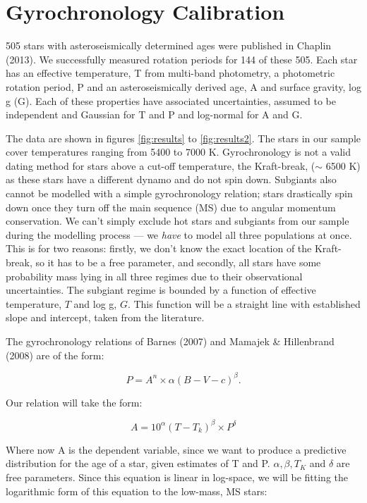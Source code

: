 \documentclass[12pt,preprint]{aastex}
\begin{document}
\section{Gyrochronology Calibration}

505 stars with asteroseismically determined ages were published in Chaplin (2013).
We successfully measured rotation periods for 144 of these 505.
Each star has an effective temperature, T from multi-band photometry, a photometric rotation period, P and an asteroseismically derived age, A and surface gravity, log g (G).
Each of these properties have associated uncertainties, assumed to be independent and Gaussian for T and P and log-normal for A and G.

The data are shown in figures \ref{fig:results} to \ref{fig:results2}.
The stars in our sample cover temperatures ranging from 5400 to 7000 K.
Gyrochronology is not a valid dating method for stars above a cut-off temperature, the Kraft-break, ($\sim$ 6500 K) as these stars have a different dynamo and do not spin down.
Subgiants also cannot be modelled with a simple gyrochronology relation; stars drastically spin down once they turn off the main sequence (MS) due to angular momentum conservation.
We can't simply exclude hot stars and subgiants from our sample during the modelling process --- we \emph{have} to model all three populations at once.
This is for two reasons: firstly, we don't know the exact location of the Kraft-break, so it has to be a free parameter,
and secondly, all stars have some probability mass lying in all three regimes due to their observational uncertainties.
The subgiant regime is bounded by a function of effective temperature, $T$ and log g, $G$.
This function will be a straight line with established slope and intercept, taken from the literature.

The gyrochronology relations of Barnes (2007) and Mamajek \& Hillenbrand (2008) are of the form:

\begin{equation}
P = A^n \times \alpha(B-V-c)^\beta.
\end{equation}

Our relation will take the form:

\begin{equation}
	A = 10^\alpha(T - T_k)^{\beta} \times P^{\delta}
\label{eq:functional_form2}
\end{equation}

Where now A is the dependent variable, since we want to produce a predictive distribution for the age of a star, given estimates of T and P.
$\alpha, \beta, T_K$ and $\delta$ are free parameters.
Since this equation is linear in log-space, we will be fitting the logarithmic form of this equation to the low-mass, MS stars:
\end{document}

